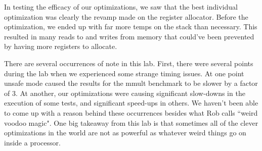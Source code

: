 \documentclass{article}
\begin{document}
In testing the efficacy of our optimizations, we saw that the best individual optimization was clearly the revamp made on the register allocator. Before the optimization, we ended up with far more temps on the stack than necessary. This resulted in many reads to and writes from memory that could've been prevented by having more registers to allocate.

There are several occurrences of note in this lab. First, there were several points during the lab when we experienced some strange timing issues. At one point unsafe mode caused the results for the mmult benchmark to be slower by a factor of 3. At another, our optimizations were causing significant slow-downs in the execution of some tests, and significant speed-ups in others. We haven't been able to come up with a reason behind these occurrences besides what Rob calls ``weird voodoo magic". One big takeaway from this lab is that sometimes all of the clever optimizations in the world are not as powerful as whatever weird things go on inside a processor.
\end{document}
